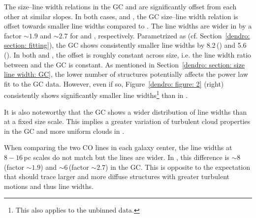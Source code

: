 The size--line width relations in the GC and  are significantly offset from each other at similar slopes. In both cases,  and , the GC size--line width relation is offset towards smaller line widths compared to . The line widths are wider in  by a factor $\sim 1.9$ and $\sim 2.7$ for  and , respectively. Parametrized as \sigmaten (cf. Section~\ref{dendro: section: fitting}), the GC shows consistently smaller line widths by 8.2\,\kms () and 5.6\,\kms (). In both  and , the offset is roughly constant across size, i.e. the line width ratio between  and the GC is constant.
As mentioned in Section~\ref{dendro: section: size line width: GC}, the lower number of structures potentially affects the power law fit to the  GC data. However, even if so, Figure~\ref{dendro: figure: 2} (right) consistently shows significantly smaller line widths\footnote{This also applies to the unbinned data.} than in .

It is also noteworthy that the GC shows a wider distribution of line widths than  at a fixed size scale. This implies a greater variation of turbulent cloud properties in the GC and more uniform clouds in .

When comparing the two CO lines in each galaxy center, the line widths at $8-16$\,pc scales do not match but the  lines are wider. In , this difference is $\sim 8$\,\kms (factor $\sim 1.9$) and $\sim 6$\,\kms (factor $\sim 2.7$) in the GC.
This is opposite to the expectation that  should trace larger and more diffuse structures with greater turbulent motions and thus line widths.

